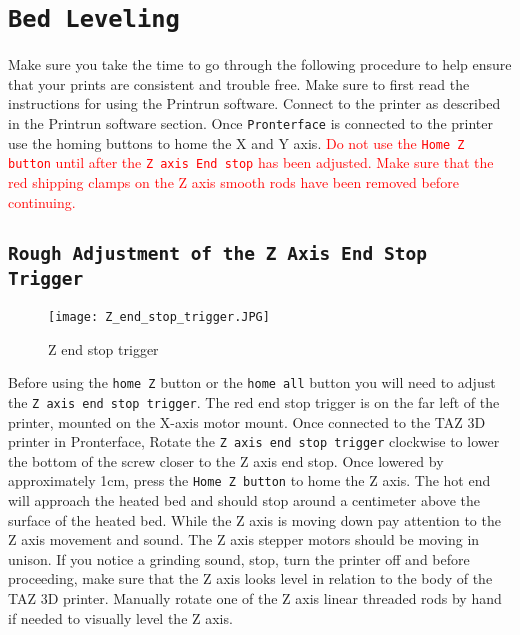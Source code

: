 %
%
%
%
%

\section{\texttt{Bed Leveling}}
Make sure you take the time to go through the following procedure to help ensure that your prints are consistent and trouble free. Make sure to first read the instructions for using the Printrun software. Connect to the printer as described in the Printrun software section. Once \texttt{Pronterface} is connected to the printer use the homing buttons to home the X and Y axis. \textcolor{red}{Do not use the \texttt{Home Z button} until after the \texttt{Z axis End stop} has been adjusted. Make sure that the red shipping clamps on the Z axis smooth rods have been removed before continuing.}

\subsection{\texttt{Rough Adjustment of the Z Axis End Stop Trigger}}
\begin{figure}[H]
\centering
\texttt{[image: Z\_end\_stop\_trigger.JPG]}
\caption{Z end stop trigger}
\label{fig:Z_end_stop_trigger}
\end{figure}
Before using the \texttt{home Z} button or the \texttt{home all} button you will need to adjust the \texttt{Z axis end stop trigger}. The red end stop trigger is on the far left of the printer, mounted on the X-axis motor mount. Once connected to the TAZ 3D printer in Pronterface, Rotate the \texttt{Z axis end stop trigger} clockwise to lower the bottom of the screw closer to the Z axis end stop. Once lowered by approximately 1cm, press the \texttt{Home Z button} to home the Z axis. The hot end will approach the heated bed and should stop around a centimeter above the surface of the heated bed. While the Z axis is moving down pay attention to the Z axis movement and sound. The Z axis stepper motors should be moving in unison. If you notice a grinding sound, stop, turn the printer off and before proceeding, make sure that the Z axis looks level in relation to the body of the TAZ 3D printer. Manually rotate one of the Z axis linear threaded rods by hand if needed to visually level the Z axis.

